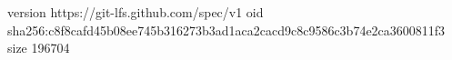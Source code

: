 version https://git-lfs.github.com/spec/v1
oid sha256:c8f8cafd45b08ee745b316273b3ad1aca2cacd9c8c9586c3b74e2ca3600811f3
size 196704
